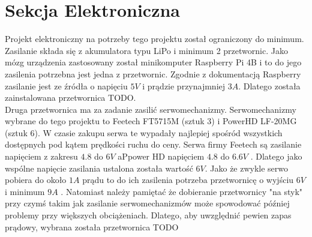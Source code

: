 \chapter{Sekcja Elektroniczna}
Projekt elektroniczny na potrzeby tego projektu został ograniczony do minimum. Zasilanie składa się z akumulatora typu LiPo i minimum 2 przetwornic. Jako mózg urządzenia zastosowany został minikomputer Raspberry Pi 4B i to do jego zasilenia potrzebna jest jedna z przetwornic. Zgodnie z dokumentacją Raspberry zasilanie jest ze źródła o napięciu $5V$ i prądzie przynajmniej $3A$.\cite{RPI_power_sup} Dlatego została zainstalowana przetwornica TODO.\\

Druga przetwornica ma za zadanie zasilić serwomechanizmy. Serwomechanizmy wybrane do tego projektu to Feetech FT5715M (sztuk 3) i PowerHD LF-20MG (sztuk 6). W czasie zakupu serwa te wypadały najlepiej spośród wszystkich dostępnych pod kątem prędkości ruchu do ceny. Serwa firmy Feetech są zasilanie napięciem z zakresu $4.8$ do $6V$ \cite{feetech_docs} aPpower HD napięciem $4.8$ do $6.6V$ \cite{powerhd_docs}. Dlatego jako wspólne napięcie zasilania ustalona została wartość $6V$. Jako że zwykle serwo pobiera do około $1A$ prądu to do ich zasilenia potrzeba przetwornicę o wyjściu $6V$ i minimum $9A$ \cite{Servo_power_sup}. Natomiast należy pamiętać że dobieranie przetwornicy "na styk" przy czymś takim jak zasilanie serwomechanizmów może spowodować później problemy przy większych obciążeniach. Dlatego, aby uwzględnić pewien zapas prądowy, wybrana została przetwornica TODO

